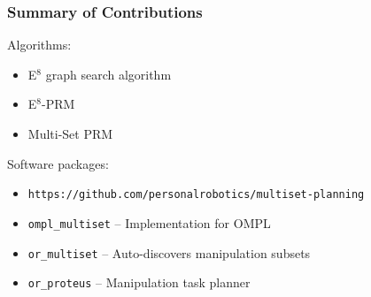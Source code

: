 \documentclass[serif]{beamer}
\begin{document}
\begin{frame}
   \frametitle{Summary of Contributions}
   
   Algorithms:
   \begin{itemize}
   \item E$^8$ graph search algorithm
   \item E$^8$-PRM
   \item Multi-Set PRM
   \end{itemize}
   
   Software packages:
   \begin{itemize}
   \item {\tt https://github.com/personalrobotics/multiset-planning}
   \item {\tt ompl\_multiset} -- Implementation for OMPL
   \item {\tt or\_multiset} -- Auto-discovers manipulation subsets
   \item {\tt or\_proteus} -- Manipulation task planner
   \end{itemize}
   
\end{frame}
\end{document}
